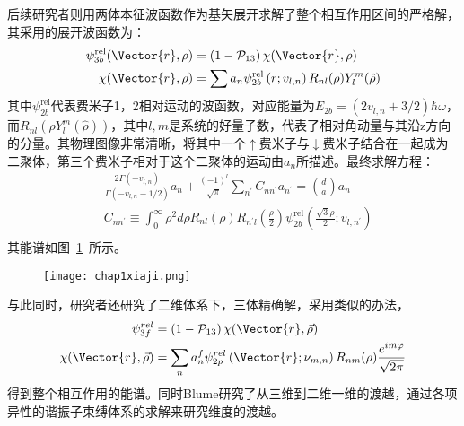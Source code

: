 后续研究者\cite{Xiaji2009prl}则用两体本征波函数作为基矢展开求解了整个相互作用区间的严格解，其采用的展开波函数为：
\begin{equation}
\begin{split}
\psi_{3 b}^{\mathrm{rel}}(\Vector{r}, \rho)&=\left(1-\mathcal{P}_{13}\right) \chi(\Vector{r}, \rho)\\
\chi(\Vector{r}, \rho)&=\sum a_{n} \psi_{2 b}^{\mathrm{rel}}\left(r ; v_{l, n}\right) R_{n l}(\rho) Y_{l}^{m}(\hat{\rho})\\
\end{split}
\end{equation}
其中$\psi_{2 b}^{\mathrm{rel}}$代表费米子1，2相对运动的波函数，对应能量为$E_{2b}=(2v_{l,n}+3/2)\hbar\omega$，而$R_{nl}(\rho Y^m_l(\hat{\rho}))$，其中$l,m$是系统的好量子数，代表了相对角动量与其沿z方向的分量。其物理图像非常清晰，将其中一个$\uparrow$费米子与$\downarrow$费米子结合在一起成为二聚体，第三个费米子相对于这个二聚体的运动由$a_n$所描述。最终求解方程：
\begin{equation}
\begin{split}
&\frac{2 \Gamma\left(-v_{l, n}\right)}{\Gamma\left(-v_{l, n}-1 / 2\right)} a_{n}+\frac{(-1)^{l}}{\sqrt{\pi}} \sum_{n^{\prime}} C_{n n^{\prime}} a_{n^{\prime}}=\left(\frac{d}{a}\right) a_{n}\\
&C_{n n^{\prime}} \equiv \int_{0}^{\infty} \rho^{2} d \rho R_{n l}(\rho) R_{n^{\prime} l}\left(\frac{\rho}{2}\right) \psi_{2 b}^{\mathrm{rel}}\left(\frac{\sqrt{3} \rho}{2} ; v_{l, n^{\prime}}\right)\\
\end{split}
\end{equation}
其能谱如图~\ref{xiaji3d}~所示。
\begin{figure}[!htbp]
    \centering
    \texttt{[image: chap1xiaji.png]}
    \label{xiaji3d}
\end{figure}
与此同时，研究者\cite{Xiaji20103b}还研究了二维体系下，三体精确解，采用类似的办法，
\begin{equation}
\begin{split}
\psi_{3 f}^{r e l}&=\left(1-\mathcal{P}_{13}\right) \chi(\Vector{r}, \vec{\rho})\\
\chi(\Vector{r}, \vec{\rho})&=\sum_{n} a_{n}^{f} \psi_{2 p}^{r e l}\left(\Vector{r} ; \nu_{m, n}\right) R_{n m}(\rho) \frac{e^{i m \varphi}}{\sqrt{2 \pi}}\\
\end{split}
\end{equation}
得到整个相互作用的能谱。同时Blume研究了从三维到二维一维的渡越\cite{blume2012}，通过各项异性的谐振子束缚体系的求解来研究维度的渡越。

